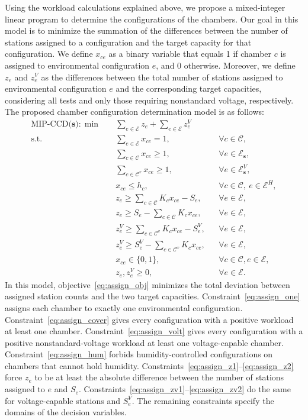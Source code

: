 Using the workload calculations explained above, we propose a mixed-integer linear program to determine the configurations of the chambers. Our goal in this model is to minimize the summation of the differences between the number of stations assigned to a configuration and the target capacity for that configuration. We define \(x_{ce}\) as a binary variable that equals 1 if chamber \(c\) is assigned to environmental configuration \(e\), and 0 otherwise. Moreover, we define \(z_e\) and \(z_e^V\) as the differences between the total number of stations assigned to environmental configuration \(e\) and the corresponding target capacities, considering all tests and only those requiring nonstandard voltage, respectively.
The proposed chamber configuration determination model is as follows:
\begin{align}
\textrm{MIP-CCD($\mathbf{s}$)}: \min\quad
& \sum_{e\in\mathcal{E}}z_e+\sum_{e\in\mathcal{E}}z_e^V
\label{eq:assign_obj}\\
\text{s.t.}\quad
& \sum_{e\in\mathcal{E}}x_{ce}=1,
&& \forall c\in\mathcal{C},
\label{eq:assign_one}\\
& \sum_{c\in\mathcal{C}}x_{ce}\ge 1,
&& \forall e\in\mathcal{E}_\mathbf{s},
\label{eq:assign_cover}\\
& \sum_{c\in\mathcal{C}^v}x_{ce}\ge 1,
&& \forall e\in\mathcal{E}^V_\mathbf{s},
\label{eq:assign_volt}\\
& x_{ce}\le h_c,
&& \forall c\in\mathcal{C},\ e\in\mathcal{E}^H,
\label{eq:assign_hum}\\
& z_e\ge \sum_{c\in\mathcal{C}}K_cx_{ce}-S_e,
&& \forall e\in\mathcal{E},
\label{eq:assign_z1}\\
& z_e\ge S_e-\sum_{c\in\mathcal{C}}K_cx_{ce},
&& \forall e\in\mathcal{E},
\label{eq:assign_z2}\\
& z_e^V\ge \sum_{c\in\mathcal{C}^v}K_cx_{ce}-S_e^V,
&& \forall e\in\mathcal{E},
\label{eq:assign_zv1}\\
& z_e^V\ge S_e^V-\sum_{c\in\mathcal{C}^v}K_cx_{ce},
&& \forall e\in\mathcal{E},
\label{eq:assign_zv2}\\
& x_{ce}\in\{0,1\},
&& \forall c \in \mathcal{C}, e \in \mathcal{E},
\label{eq:assign_bin}\\
& z_e,z_e^V\ge 0,
&& \forall e \in \mathcal{E}.
\label{eq:assign_dom}
\end{align}
In this model, objective~\eqref{eq:assign_obj} minimizes the total deviation between assigned station counts and the two target capacities. Constraint~\eqref{eq:assign_one} assigns each chamber to exactly one environmental configuration. Constraint~\eqref{eq:assign_cover} gives every configuration with a positive workload at least one chamber. Constraint~\eqref{eq:assign_volt} gives every configuration with a positive nonstandard-voltage workload at least one voltage-capable chamber. Constraint~\eqref{eq:assign_hum} forbids humidity-controlled configurations on chambers that cannot hold humidity. Constraints~\eqref{eq:assign_z1}--\eqref{eq:assign_z2} force \(z_e\) to be at least the absolute difference between the number of stations assigned to \(e\) and \(S_e\). Constraints~\eqref{eq:assign_zv1}--\eqref{eq:assign_zv2} do the same for voltage-capable stations and \(S_e^V\). The remaining constraints specify the domains of the decision variables.

